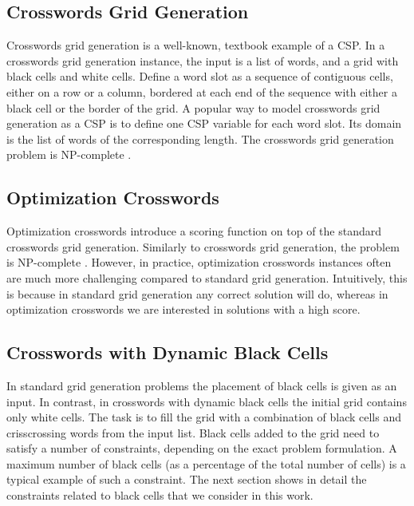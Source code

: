 \subsection{Crosswords Grid Generation}

Crosswords grid generation is a well-known, textbook example of a CSP.
In a crosswords grid generation instance, the input is a list of words, and 
a grid with black cells and white cells.
Define a word slot as a sequence of contiguous cells, either on a row or a column,
bordered at each end of the sequence with either a black cell or the border of the grid.
A popular way to model crosswords grid generation as a CSP is to 
define one CSP variable for each word slot.
Its domain is the list of words of the corresponding length.
The crosswords grid generation problem is NP-complete \cite{garey1979computers,10.1007/978-3-642-30347-0_15}.

\subsection{Optimization Crosswords}

Optimization crosswords introduce a scoring function on top of the 
standard crosswords grid generation.
Similarly to crosswords grid generation, the problem is NP-complete \cite{DBLP:conf/socs/BoteaB21}.
However, in practice, optimization crosswords instances often are much more
challenging compared to standard grid generation.
Intuitively, this is because in standard grid generation any correct solution will do,
whereas in optimization crosswords we are interested in solutions with a high score.

\subsection{Crosswords with Dynamic Black Cells}

In standard grid generation problems the placement of black cells is
given as an input.
In contrast, in crosswords with dynamic black cells the initial grid contains 
only white cells. 
The task is to fill the grid with a combination of black cells
and crisscrossing words from the input list.
Black cells added to the grid need to satisfy a number of constraints,
depending on the exact problem formulation.
A maximum number of black cells (as a percentage of the total number of cells)
is a typical example of such a constraint.
The next section shows in detail the constraints related to black cells 
that we consider in this work.

